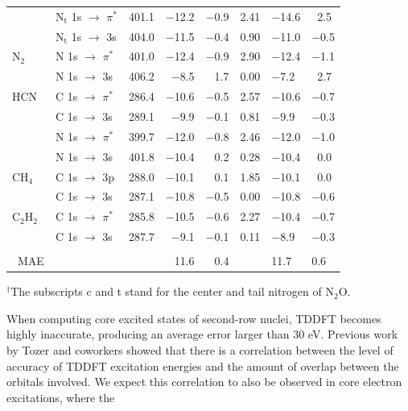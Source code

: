 \documentclass[8.5pt,twoside,twocolumn]{article}
\begin{document}
\begin{table}[!ht]
\begin{tabular*}{12.5cm}{@{\extracolsep{\fill} }llcrrrHH}
    ~         & N$_\text{t}$ 1s $\rightarrow$ $\pi^*$ & 401.1 & $-$12.2     & $-$0.9 & 2.41 & $-$14.6    & \ 2.5   \\
    ~         & N$_\text{t}$ 1s $\rightarrow$ 3s      & 404.0   & $-$11.5    & $-$0.4 & 0.90   & $-$11.0    & $-$0.5  \\
    N$_2$         &N 1s  $\rightarrow$ $\pi^*$ & 401.0 & $-$12.4 & $-$0.9 & 2.90 & $-$12.4 & $-$1.1 \\
    ~         & N 1s  $\rightarrow$ 3s & 406.2 & $-$8.5 & 1.7 & 0.00  & $-$7.2 & \ 2.7\\ 
    HCN       & C 1s $\rightarrow$ $\pi^*$     & 286.4 & $-$10.6     & $-$0.5 & 2.57  & $-$10.6    & $-$0.7  \\
    ~         & C 1s $\rightarrow$ 3s          & 289.1 & $-$9.9      & $-$0.1 & 0.81   & $-$9.9    & $-$0.3  \\
    ~         & N 1s $\rightarrow$  $\pi^*$    & 399.7 & $-$12.0     & $-$0.8 & 2.46  & $-$12.0    & $-$1.0  \\
    ~         & N 1s $\rightarrow$ 3s          & 401.8 & $-$10.4      & \ 0.2 & 0.28    & $-$10.4    & \ 0.0  \\
    CH$_4$      & C 1s $\rightarrow$ 3p          & 288.0   & $-$10.1      & \ 0.1 & 1.85   & $-$10.1    & \ 0.0   \\
    ~         & C 1s $\rightarrow$ 3s          & 287.1 & $-$10.8    & $-$0.5 & 0.00   & $-$10.8     & $-$0.6 \\ 
        C$_2$H$_2$      & C 1s $\rightarrow$ $\pi^*$           & 285.8   & $-$10.5      & $-$0.6 & 2.27   & $-$10.4   & $-$0.7  \\
    ~         & C 1s $\rightarrow$ 3s            & 287.7 & $-$9.1 & $-$0.1 & 0.11   & $-$8.9    & $-$0.3\\\\
    ~MAE         &                            & ~     & 11.6      & 0.4 &   & 11.7     & 0.6 \\ 
    \hline
    \hline
    \end{tabular*}
    
    $^{\dagger}$The subscripts c and t stand for the center and tail nitrogen of N$_2$O.
    
     \label{table:FirstRow}
     \end{table}
When computing core excited states of second-row nuclei, TDDFT becomes highly inaccurate, producing an average error larger than 30 eV. Previous work by Tozer and coworkers \cite{peach_excitation_2008}  showed that there is a correlation between the level of accuracy of TDDFT excitation energies and the amount of overlap between the orbitals involved. We expect this correlation to also be observed in core electron excitations, where the
\end{document}
